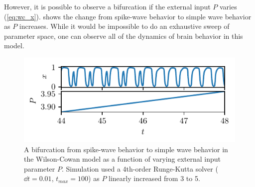 However, it is possible to observe a bifurcation if the external input $P$ varies (\cref{eq:wc_x}).
 shows the change from spike-wave behavior to simple wave behavior as $P$ increases.
While it would be impossible to do an exhaustive sweep of parameter space, one can observe all of the dynamics of brain behavior in this model.
\begin{figure}[ht]
  \centering
  \includegraphics{figure/wc_bifurcation}
  \caption[Wilson-Cowan bifurcation]{A bifurcation from spike-wave behavior to simple wave behavior in the Wilson-Cowan model as a function of varying external input parameter $P$.
    Simulation used a 4th-order Runge-Kutta solver ($\dd{t} = 0.01$, $t_{max} = 100$) as $P$ linearly increased from 3 to 5.
  }
  \label{fig:wc_bifurcation}
\end{figure}

